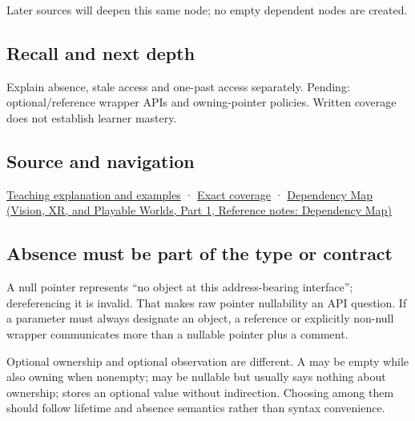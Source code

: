 Later sources will deepen this same node; no empty dependent nodes are created.

\subsection{Recall and next depth}\label{appendix-afae48c31800-recall-and-next-depth}

\hypertarget{appendix-afae48c31800-recall-and-next-depth}{}

Explain absence, stale access and one-past access separately. Pending: optional/reference wrapper APIs and owning-pointer policies. Written coverage does not establish learner mastery.

\subsection{Source and navigation}\label{appendix-afae48c31800-source-and-navigation}

\hypertarget{appendix-afae48c31800-source-and-navigation}{}

\hyperref[01-foundations-i-ch003-a-pointer-carries-an-access-contract]{Teaching explanation and examples} · \hyperref[appendix-fd090d982a15-m008---parts-113-126]{Exact coverage} · \href{../07-Vision-XR-and-Playable-Worlds-P01/main.pdf\#nameddest=appendix-4ad47bdd269a}{Dependency Map (Vision, XR, and Playable Worlds, Part 1, Reference notes: Dependency Map)}

\subsection{Absence must be part of the type or contract}\label{appendix-afae48c31800-absence-must-be-part-of-the-type-or-contract}

\hypertarget{appendix-afae48c31800-absence-must-be-part-of-the-type-or-contract}{}

A null pointer represents ``no object at this address-bearing interface''; dereferencing it is invalid. That makes raw pointer nullability an API question. If a parameter must always designate an object, a reference or explicitly non-null wrapper communicates more than a nullable pointer plus a comment.

Optional ownership and optional observation are different. A  may be empty while also owning when nonempty;  may be nullable but usually says nothing about ownership;  stores an optional value without indirection. Choosing among them should follow lifetime and absence semantics rather than syntax convenience.

